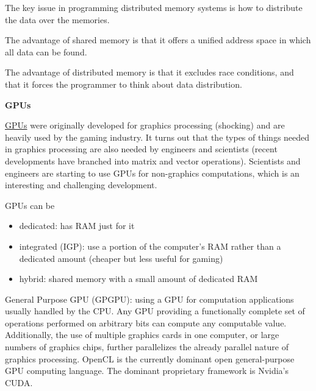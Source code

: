 \documentclass[12pt]{article}
\begin{document}
The key issue in programming distributed memory systems is how to distribute the data over the memories. %

The advantage of shared memory is that it offers a unified address space in which all data can be found.

The advantage of distributed memory is that it excludes race conditions, and that it forces the programmer to think about data distribution.




\vspace*{2em}
\noindent \textbf{GPUs}

\underline{GPUs} were originally developed for graphics processing (shocking) and are heavily used by the gaming industry. It turns out that the types of things needed in graphics processing are also needed by engineers and scientists (recent developments have branched into matrix and vector operations). Scientists and engineers are starting to use GPUs for non-graphics computations, which is an interesting and challenging development. 

GPUs can be 
\begin{itemize}
\item dedicated: has RAM just for it
\item integrated (IGP): use a portion of the computer's RAM rather than a dedicated amount (cheaper but less useful for gaming)
\item hybrid: shared memory with a small amount of dedicated RAM
\end{itemize}

General Purpose GPU (GPGPU): using a GPU for computation applications usually handled by the CPU. Any GPU providing a functionally complete set of operations performed on arbitrary bits can compute any computable value. Additionally, the use of multiple graphics cards in one computer, or large numbers of graphics chips, further parallelizes the already parallel nature of graphics processing. OpenCL is the currently dominant open general-purpose GPU computing language. The dominant proprietary framework is Nvidia's CUDA.
\end{document}
